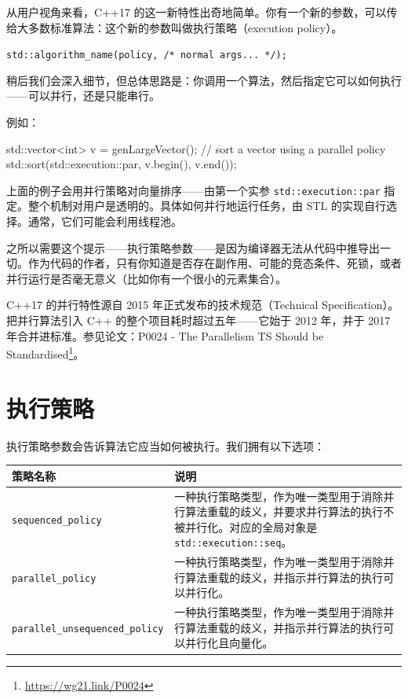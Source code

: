 从用户视角来看，C++17 的这一新特性出奇地简单。你有一个新的参数，可以传给大多数标准算法：这个新的参数叫做执行策略（execution policy）。

\texttt{std::algorithm\_name(policy, /* normal args... */);}

稍后我们会深入细节，但总体思路是：你调用一个算法，然后指定它可以如何执行——可以并行，还是只能串行。

例如：

\begin{codebox}[cpp]
std::vector<int> v = genLargeVector();
// sort a vector using a parallel policy
std::sort(std::execution::par, v.begin(), v.end());
\end{codebox}

上面的例子会用并行策略对向量排序——由第一个实参 \texttt{std::execution::par} 指定。整个机制对用户是透明的。具体如何并行地运行任务，由 STL 的实现自行选择。通常，它们可能会利用线程池。

之所以需要这个提示——执行策略参数——是因为编译器无法从代码中推导出一切。作为代码的作者，只有你知道是否存在副作用、可能的竞态条件、死锁，或者并行运行是否毫无意义（比如你有一个很小的元素集合）。

C++17 的并行特性源自 2015 年正式发布的技术规范（Technical Specification）。把并行算法引入 C++ 的整个项目耗时超过五年——它始于 2012 年，并于 2017 年合并进标准。参见论文：P0024 - The Parallelism TS Should be Standardised\footnote{\url{https://wg21.link/P0024}}。


\section{执行策略}

执行策略参数会告诉算法它应当如何被执行。我们拥有以下选项：

\begin{table}[H]
\centering
\begin{tabularx}{\textwidth}{X X}
\toprule
策略名称 & 说明 \\
\midrule
\texttt{sequenced\_policy} & 一种执行策略类型，作为唯一类型用于消除并行算法重载的歧义，并要求并行算法的执行不被并行化。对应的全局对象是 \texttt{std::execution::seq}。 \\
\texttt{parallel\_policy} & 一种执行策略类型，作为唯一类型用于消除并行算法重载的歧义，并指示并行算法的执行可以并行化。 \\
\texttt{parallel\_unsequenced\_policy} & 一种执行策略类型，作为唯一类型用于消除并行算法重载的歧义，并指示并行算法的执行可以并行化且向量化。 \\
\bottomrule
\end{tabularx}
\end{table}

